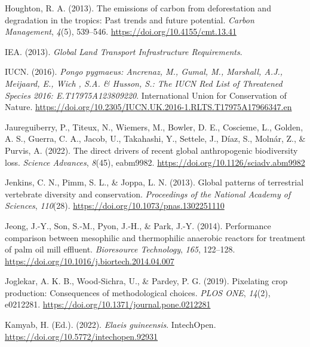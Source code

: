 \documentclass[
  letterpaper,
  DIV=11,
  numbers=noendperiod]{scrreprt}
\newlength{\cslhangindent}
\newlength{\cslentryspacingunit} %
\newenvironment{CSLReferences}[2] %
 {%
  \setlength{\parindent}{0pt}
  \ifodd #1
  \let\oldpar\par
  \def\par{\hangindent=\cslhangindent\oldpar}
  \fi
  \setlength{\parskip}{#2\cslentryspacingunit}
 }%
 {}
\begin{document}
\begin{CSLReferences}{1}{0}
\leavevmode{}%
Houghton, R. A. (2013). The emissions of carbon from deforestation and
degradation in the tropics: Past trends and future potential.
\emph{Carbon Management}, \emph{4}(5), 539--546.
\url{https://doi.org/10.4155/cmt.13.41}

\leavevmode{}%
IEA. (2013). \emph{Global {Land Transport Infrastructure Requirements}}.

\leavevmode{}%
IUCN. (2016). \emph{Pongo pygmaeus: {Ancrenaz}, {M}., {Gumal}, {M}.,
{Marshall}, {A}.{J}., {Meijaard}, {E}., {Wich} , {S}.{A}. \& {Husson},
{S}.: {The IUCN Red List} of {Threatened Species} 2016:
E.{T17975A123809220}}. {International Union for Conservation of Nature}.
\url{https://doi.org/10.2305/IUCN.UK.2016-1.RLTS.T17975A17966347.en}

\leavevmode{}%
Jaureguiberry, P., Titeux, N., Wiemers, M., Bowler, D. E., Coscieme, L.,
Golden, A. S., Guerra, C. A., Jacob, U., Takahashi, Y., Settele, J.,
Díaz, S., Molnár, Z., \& Purvis, A. (2022). The direct drivers of recent
global anthropogenic biodiversity loss. \emph{Science Advances},
\emph{8}(45), eabm9982. \url{https://doi.org/10.1126/sciadv.abm9982}

\leavevmode{}%
Jenkins, C. N., Pimm, S. L., \& Joppa, L. N. (2013). Global patterns of
terrestrial vertebrate diversity and conservation. \emph{Proceedings of
the National Academy of Sciences}, \emph{110}(28).
\url{https://doi.org/10.1073/pnas.1302251110}

\leavevmode{}%
Jeong, J.-Y., Son, S.-M., Pyon, J.-H., \& Park, J.-Y. (2014).
Performance comparison between mesophilic and thermophilic anaerobic
reactors for treatment of palm oil mill effluent. \emph{Bioresource
Technology}, \emph{165}, 122--128.
\url{https://doi.org/10.1016/j.biortech.2014.04.007}

\leavevmode{}%
Joglekar, A. K. B., Wood-Sichra, U., \& Pardey, P. G. (2019). Pixelating
crop production: {Consequences} of methodological choices. \emph{PLOS
ONE}, \emph{14}(2), e0212281.
\url{https://doi.org/10.1371/journal.pone.0212281}

\leavevmode{}%
Kamyab, H. (Ed.). (2022). \emph{Elaeis guineensis}. {IntechOpen}.
\url{https://doi.org/10.5772/intechopen.92931}


\end{CSLReferences}
\end{document}
